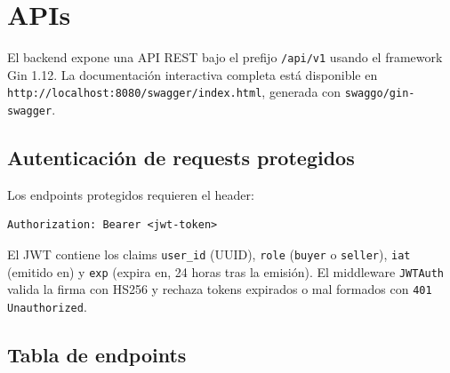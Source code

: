 \documentclass[12pt,a4paper]{article}
\begin{document}
\section{APIs}

El backend expone una API REST bajo el prefijo \texttt{/api/v1} usando el framework Gin 1.12. La documentación interactiva completa está disponible en
\texttt{http://localhost:8080/swagger/index.html}, generada con \texttt{swaggo/gin-swagger}.
\subsection{Autenticación de requests protegidos}

Los endpoints protegidos requieren el header:
\begin{lstlisting}[style=gostyle, numbers=none]
Authorization: Bearer <jwt-token>
\end{lstlisting}

El JWT contiene los claims \texttt{user\_id} (UUID), \texttt{role} (\texttt{buyer} o
\texttt{seller}), \texttt{iat} (emitido en) y \texttt{exp} (expira en, 24 horas tras la emisión). El middleware \texttt{JWTAuth} valida la firma con HS256 y rechaza tokens expirados o
mal formados con \texttt{401 Unauthorized}.
\subsection{Tabla de endpoints}
\end{document}
